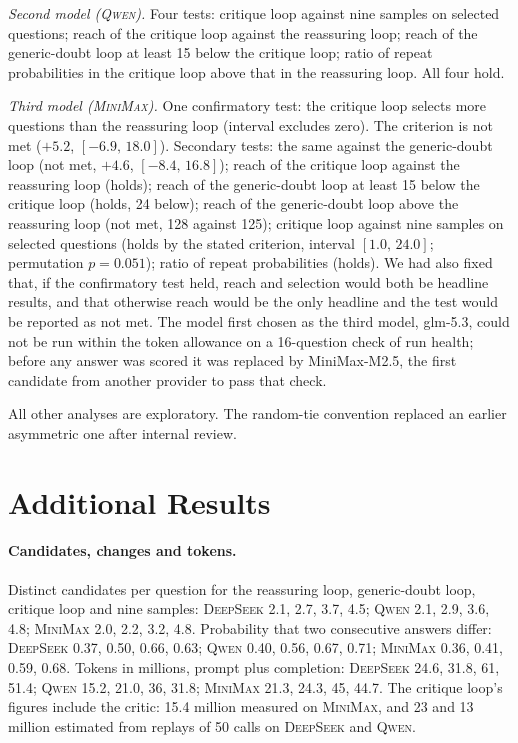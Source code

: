 \documentclass[11pt]{article}
\newcommand{\ds}{\textsc{DeepSeek}}
\newcommand{\qw}{\textsc{Qwen}}
\newcommand{\mm}{\textsc{MiniMax}}
\newcommand{\ci}[2]{$[#1,\,#2]$}
\begin{document}
\emph{Second model (\qw).}
Four tests: critique loop against nine samples on selected questions; reach of the critique loop against the reassuring loop; reach of the generic-doubt loop at least 15 below the critique loop; ratio of repeat probabilities in the critique loop above that in the reassuring loop.
All four hold.

\emph{Third model (\mm).}
One confirmatory test: the critique loop selects more questions than the reassuring loop (interval excludes zero).
The criterion is not met ($+5.2$, \ci{-6.9}{18.0}).
Secondary tests: the same against the generic-doubt loop (not met, $+4.6$, \ci{-8.4}{16.8}); reach of the critique loop against the reassuring loop (holds); reach of the generic-doubt loop at least 15 below the critique loop (holds, 24 below); reach of the generic-doubt loop above the reassuring loop (not met, 128 against 125); critique loop against nine samples on selected questions (holds by the stated criterion, interval \ci{1.0}{24.0}; permutation $p=0.051$); ratio of repeat probabilities (holds).
We had also fixed that, if the confirmatory test held, reach and selection would both be headline results, and that otherwise reach would be the only headline and the test would be reported as not met.
The model first chosen as the third model, glm-5.3, could not be run within the token allowance on a 16-question check of run health; before any answer was scored it was replaced by MiniMax-M2.5, the first candidate from another provider to pass that check.

All other analyses are exploratory.
The random-tie convention replaced an earlier asymmetric one after internal review.

\section{Additional Results}
\label{app:more}

\paragraph{Candidates, changes and tokens.}
Distinct candidates per question for the reassuring loop, generic-doubt loop, critique loop and nine samples: \ds{} 2.1, 2.7, 3.7, 4.5; \qw{} 2.1, 2.9, 3.6, 4.8; \mm{} 2.0, 2.2, 3.2, 4.8.
Probability that two consecutive answers differ: \ds{} 0.37, 0.50, 0.66, 0.63; \qw{} 0.40, 0.56, 0.67, 0.71; \mm{} 0.36, 0.41, 0.59, 0.68.
Tokens in millions, prompt plus completion: \ds{} 24.6, 31.8, 61, 51.4; \qw{} 15.2, 21.0, 36, 31.8; \mm{} 21.3, 24.3, 45, 44.7.
The critique loop's figures include the critic: 15.4 million measured on \mm, and 23 and 13 million estimated from replays of 50 calls on \ds{} and \qw.
\end{document}
